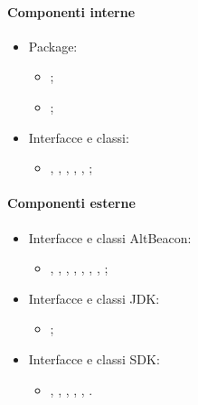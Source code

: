 \documentclass[../Funzionalita.tex]{subfiles}
\begin{document}
			\paragraph*{Componenti interne}
			\begin{itemize}
			
				\item Package:
				\begin{itemize}
					\item[] \model;
					\item[] \beacon;
				\end{itemize}
				
				\item Interfacce e classi:
				\begin{itemize}
					\item[] \BeaconManagerAdapter, \MyBeacon, \MyBeaconImp, \MyDistanceCalculator, \LocalBinder, \BeaconRanger;
				\end{itemize}
												
			\end{itemize}
			
			\paragraph*{Componenti esterne}
			\begin{itemize}
			
				\item Interfacce e classi \gls{AltBeacon}:
				\begin{itemize}
					\item[] \BeaconManager, \BootstrapNotifier, \BeaconConsumer, \RangeNotifier, \Region, \BeaconParser, \DistanceCalculator, \Beacon;
				\end{itemize}
			
				\item Interfacce e classi JDK:
				\begin{itemize}
					\item[] \PriorityQueue;
				\end{itemize}
				
				\item Interfacce e classi SDK:
				\begin{itemize}
					\item[] \Intent, \LocalBroadcastManager, \Service, \Binder, \LocalBroadcastManager, \IBinder.
				\end{itemize}
				
				
				
			\end{itemize}
			
\end{document}
